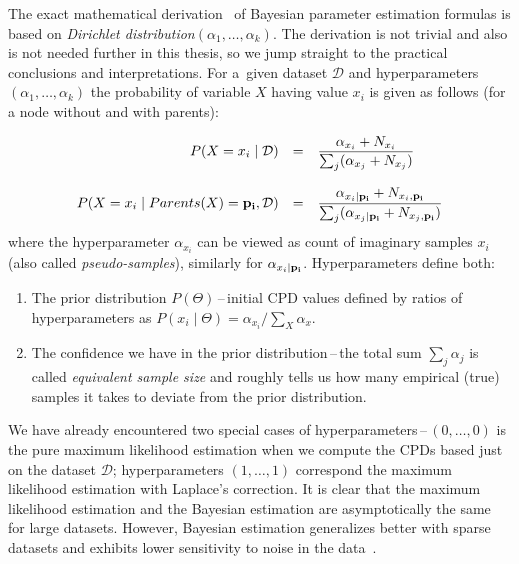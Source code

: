 \documentclass[english,cover]{fitthesis} %
\newcommand{\term}[1]{\emph{#1}}           %
\newcommand{\vars}[1]{{\bold{#1}}}         %
\begin{document}
The exact mathematical derivation~\cite[p.~733]{pgm} of Bayesian parameter estimation formulas is based on \term{Dirichlet distribution}$(\alpha_1,\dots,\alpha_k)$. The derivation is not trivial and also is not needed further in this thesis, so we jump straight to the practical conclusions and interpretations. For a~given dataset $\mathcal{D}$ and hyperparameters $(\alpha_1, \dots, \alpha_k)$ the probability of variable $X$ having value $x_i$ is given as follows (for a node without and with parents):

\begin{equation*}
    \begin{array}{rcl}
    P(X = x_i \mid \mathcal{D}) &
     = &
     \displaystyle\frac
        {\alpha_{x_i} + N_{x_i}}
        {\sum_j (\alpha_{x_j} + N_{x_j})}\\
        & & \\
    P(X = x_i \mid Parents(X) = \vars{p_i}, \mathcal{D}) &
     = &
     \displaystyle\frac
        {\alpha_{x_i \mid \vars{p_i}} + N_{x_i, \vars{p_i}}}
        {\sum_j (\alpha_{x_j \mid \vars{p_i}} + N_{x_j, \vars{p_i}})}
    \end{array}
\end{equation*}
where the hyperparameter $\alpha_{x_i}$ can be viewed as count of imaginary samples $x_i$ (also called \term{pseudo-samples}), similarly for $\alpha_{x_i \mid \vars{p_i}}$. Hyperparameters define both:
\begin{enumerate}
	\item The prior distribution $P(\Theta)$\,--\,initial CPD values defined by ratios of hyperparameters as $P(x_i \mid \Theta) = \alpha_{x_i} / \sum_X \alpha_x$.
	\item The confidence we have in the prior distribution\,--\,the total sum $\sum_j \alpha_j$ is called \term{equivalent sample size} and roughly tells us how many empirical (true) samples it takes to deviate from the prior distribution.
\end{enumerate}
We have already encountered two special cases of hyperparameters\,--\,$(0,\dots,0)$ is the pure maximum likelihood estimation when we compute the CPDs based just on the dataset $\mathcal{D}$; hyperparameters $(1,\dots,1)$ correspond the maximum likelihood estimation with Laplace's correction.
It is clear that the maximum likelihood estimation and the Bayesian estimation are asymptotically the same for large datasets. However, Bayesian estimation generalizes better with sparse datasets and exhibits lower sensitivity to noise in the data~\cite[p.~749]{pgm}.
\end{document}
